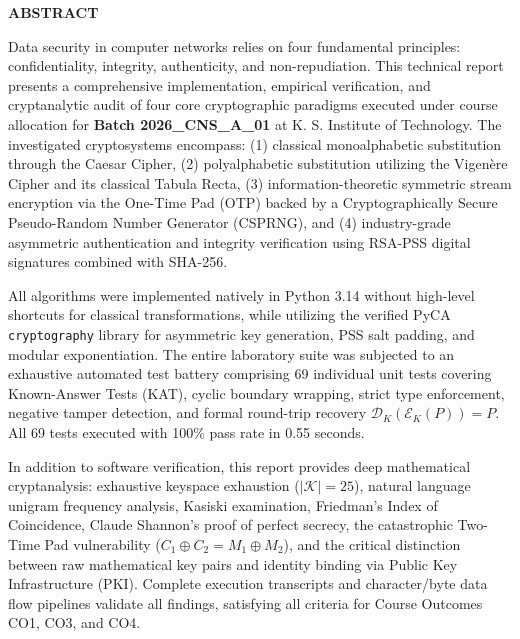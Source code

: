 \documentclass[12pt,a4paper]{report}
\begin{document}
\pagestyle{preliminary}

\begin{center}
    {\fontsize{14}{16}\bfseries ABSTRACT}\\[1.5em]
\end{center}

Data security in computer networks relies on four fundamental principles: confidentiality, integrity, authenticity, and non-repudiation. This technical report presents a comprehensive implementation, empirical verification, and cryptanalytic audit of four core cryptographic paradigms executed under course allocation for \textbf{Batch 2026\_CNS\_A\_01} at K. S. Institute of Technology. The investigated cryptosystems encompass: (1) classical monoalphabetic substitution through the Caesar Cipher, (2) polyalphabetic substitution utilizing the Vigen\`ere Cipher and its classical Tabula Recta, (3) information-theoretic symmetric stream encryption via the One-Time Pad (OTP) backed by a Cryptographically Secure Pseudo-Random Number Generator (CSPRNG), and (4) industry-grade asymmetric authentication and integrity verification using RSA-PSS digital signatures combined with SHA-256.

All algorithms were implemented natively in Python 3.14 without high-level shortcuts for classical transformations, while utilizing the verified PyCA \texttt{cryptography} library for asymmetric key generation, PSS salt padding, and modular exponentiation. The entire laboratory suite was subjected to an exhaustive automated test battery comprising 69 individual unit tests covering Known-Answer Tests (KAT), cyclic boundary wrapping, strict type enforcement, negative tamper detection, and formal round-trip recovery $\mathcal{D}_K(\mathcal{E}_K(P)) = P$. All 69 tests executed with 100\% pass rate in 0.55 seconds.

In addition to software verification, this report provides deep mathematical cryptanalysis: exhaustive keyspace exhaustion ($|\mathcal{K}| = 25$), natural language unigram frequency analysis, Kasiski examination, Friedman's Index of Coincidence, Claude Shannon's proof of perfect secrecy, the catastrophic Two-Time Pad vulnerability ($C_1 \oplus C_2 = M_1 \oplus M_2$), and the critical distinction between raw mathematical key pairs and identity binding via Public Key Infrastructure (PKI). Complete execution transcripts and character/byte data flow pipelines validate all findings, satisfying all criteria for Course Outcomes CO1, CO3, and CO4.
\end{document}
